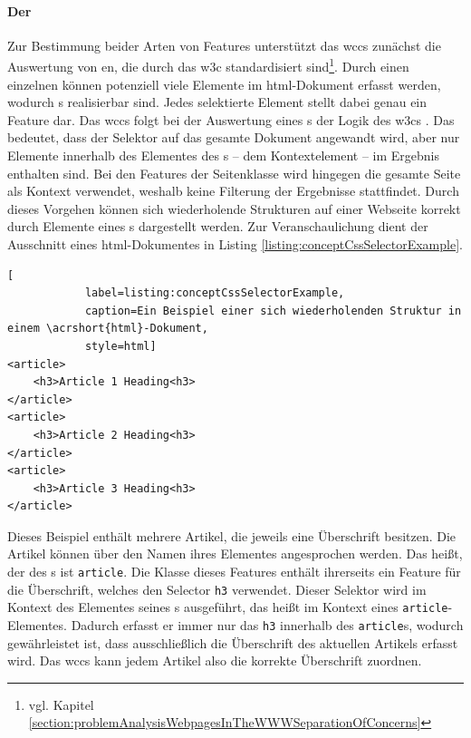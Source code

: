         \paragraph{Der \cssSelector}
        Zur Bestimmung beider Arten von Features unterstützt das \gls{wccs} zunächst
        die Auswertung von {\cssSelector}en, die durch das \gls{w3c} standardisiert
        sind\footnote{vgl. Kapitel \ref{section:problemAnalysisWebpagesInTheWWWSeparationOfConcerns}}.
        Durch einen einzelnen {\cssSelector} können potenziell viele Elemente im \gls{html}-Dokument
        erfasst werden, wodurch {\collectionFeature}s realisierbar sind.
        Jedes selektierte Element stellt dabei genau ein Feature dar.
        Das \gls{wccs} folgt bei der Auswertung eines {\cssSelector}s der Logik des \glspl{w3c} \cite{w3c:selectorsAPI}.
        Das bedeutet, dass der Selektor auf das gesamte Dokument angewandt wird,
        aber nur Elemente innerhalb des Elementes des {\parentFeature}s -- dem Kontextelement --
        im Ergebnis enthalten sind.
        Bei den Features der Seitenklasse wird hingegen die gesamte Seite als Kontext verwendet,
        weshalb keine Filterung der Ergebnisse stattfindet.
        Durch dieses Vorgehen können sich wiederholende Strukturen auf einer Webseite
        korrekt durch Elemente eines {\collectionFeature}s dargestellt werden.
        Zur Veranschaulichung dient der Ausschnitt eines \gls{html}-Dokumentes
        in Listing \ref{listing:conceptCssSelectorExample}.

        \begin{lstlisting}[
            label=listing:conceptCssSelectorExample,
            caption=Ein Beispiel einer sich wiederholenden Struktur in einem \acrshort{html}-Dokument,
            style=html]
<article>
    <h3>Article 1 Heading<h3>
</article>
<article>
    <h3>Article 2 Heading<h3>
</article>
<article>
    <h3>Article 3 Heading<h3>
</article>
        \end{lstlisting}

        Dieses Beispiel enthält mehrere Artikel, die jeweils eine Überschrift besitzen.
        Die Artikel können über den Namen ihres Elementes angesprochen werden.
        Das heißt, der {\cssSelector} des {\collectionFeature}s ist \texttt{article}.
        Die Klasse dieses Features enthält ihrerseits ein Feature für die Überschrift,
        welches den Selector \texttt{h3} verwendet.
        Dieser Selektor wird im Kontext des Elementes seines {\parentFeature}s ausgeführt,
        das heißt im Kontext eines \texttt{article}-Elementes.
        Dadurch erfasst er immer nur das \texttt{h3} innerhalb des \texttt{article}s,
        wodurch gewährleistet ist, dass ausschließlich die Überschrift des aktuellen Artikels erfasst wird.
        Das \gls{wccs} kann jedem Artikel also die korrekte Überschrift zuordnen.

